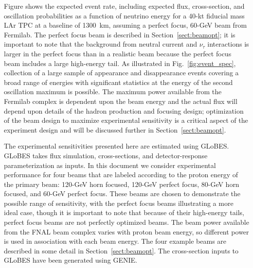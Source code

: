 Figure
shows the expected event rate, including
expected flux, cross-section, and oscillation probabilities as a function 
of neutrino energy for a 40-kt fiducial mass LAr TPC at a baseline of 1300~km, 
assuming a perfect
focus, 60-GeV beam from Fermilab. The perfect focus beam is described in
Section~\ref{sect:beamopt}; it is important to note that the background from
neutral current and $\nu_\tau$ interactions is larger in the perfect focus 
than in a realistic beam because the perfect focus beam includes a large high-energy
tail. As illustrated in Fig.~\ref{fig:event_spec}, collection of
a large sample of \nue appearance and \numu disappearance 
events covering a broad range of energies with significant statistics at the energy
of the second oscillation maximum is possible.
The maximum power available from the Fermilab complex is dependent upon 
the beam energy and the actual flux will depend upon details of the hadron
production and focusing design; 
optimization of the beam design
to maximize experimental sensitivity is a critical aspect of the experiment
design and will be discussed further in Section~\ref{sect:beamopt}.
%

The experimental sensitivities presented here are estimated using 
GLoBES\cite{globes1,globes2}. GLoBES takes flux simulation, cross-sections,
and detector-response parameterization as inputs. In this document we
consider experimental performance for four beams that are labeled according
to the proton energy of the primary beam: 120-GeV horn focused, 120-GeV perfect focus,
80-GeV horn focused, and 60-GeV perfect focus. These beams are chosen to demonstrate
the possible range of sensitivity, with the perfect focus beams illustrating a more
ideal case, though it is important to note that because of their high-energy tails, perfect
focus beams are not perfectly optimized beams. The beam power available from the FNAL
beam complex varies with proton beam energy, so different power is used in
association with each beam energy. The four example beams are described in some
detail in Section~\ref{sect:beamopt}. The cross-section inputs to GLoBES have
been generated using GENIE.


